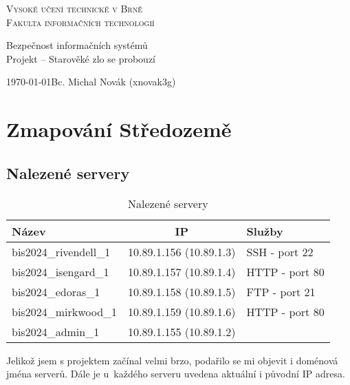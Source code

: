 \documentclass[a4paper, 11pt]{article}
\begin{document}
    \begin{titlepage}
        \begin{center}
            \Huge{\scshape{Vysoké učení technické v Brně}\\}
            \huge{\scshape Fakulta informačních technologií\\}

            \LARGE{Bezpečnost informačních systémů\\}
            \Huge{Projekt – Starověké zlo se probouzí}

        \end{center}
        
        \Large{\today \hfill Bc. Michal Novák (xnovak3g)}
    \end{titlepage}


\section{Zmapování Středozemě}
\subsection{Nalezené servery}

\begin{table}[!ht]
    \centering
    \begin{tabular}{|l|c|l|}
         \hline
         Název & IP & Služby \\ 
         \hline\hline
         bis2024\_rivendell\_1 & 10.89.1.156 (10.89.1.3) & SSH - port 22\\ 
         \hline
         bis2024\_isengard\_1 & 10.89.1.157 (10.89.1.4) & HTTP - port 80\\
         \hline
         bis2024\_edoras\_1 & 10.89.1.158 (10.89.1.5) & FTP - port 21\\
         \hline
         bis2024\_mirkwood\_1 & 10.89.1.159 (10.89.1.6) & HTTP - port 80\\
         \hline
         bis2024\_admin\_1 & 10.89.1.155 (10.89.1.2) & \\
         \hline
         
    \end{tabular}
    \caption{Nalezené servery}
    \label{tab:my_label}
\end{table}

Jelikož jsem s projektem začínal velmi brzo, podařilo se mi objevit i doménová jména serverů. Dále je u~každého serveru uvedena aktuální i původní IP adresa.
\end{document}
